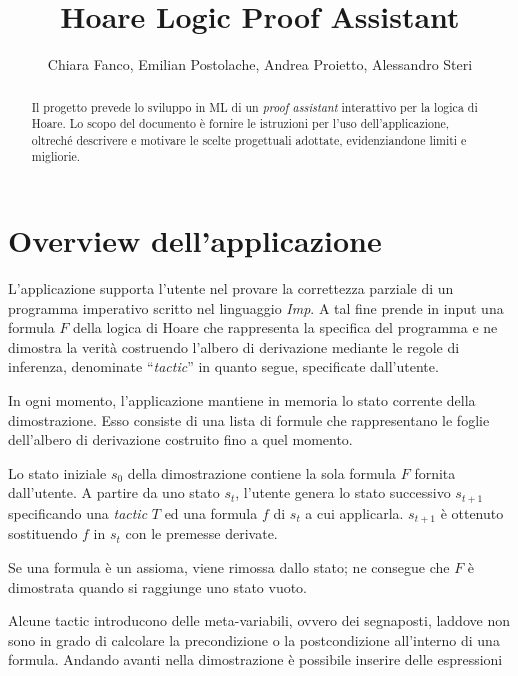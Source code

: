 \documentclass[]{article}
\title{Hoare Logic Proof Assistant}
\author{Chiara Fanco, Emilian Postolache, Andrea Proietto, Alessandro Steri}
\begin{document}
\maketitle

\begin{abstract}
Il progetto prevede lo sviluppo in ML di un \emph{proof assistant} interattivo per la logica di Hoare. Lo scopo del documento \`e fornire le istruzioni per l'uso dell'applicazione, oltrech\'e descrivere e motivare le scelte progettuali adottate, evidenziandone limiti e migliorie.
\end{abstract}

\section{Overview dell'applicazione}
L'applicazione supporta l'utente nel provare la correttezza parziale di un programma imperativo scritto nel linguaggio \emph{Imp}. %
 A tal fine prende in input una formula $F$ della logica di Hoare che rappresenta la specifica del programma e ne dimostra la verit\`a costruendo l'albero di derivazione mediante le regole di inferenza, denominate ``\emph{tactic}'' in quanto segue, specificate dall'utente.
\par
In ogni momento, l'applicazione mantiene in memoria lo stato corrente della dimostrazione. Esso consiste di una lista di formule che rappresentano le foglie dell'albero di derivazione costruito fino a quel momento.
\par
Lo stato iniziale $s_0$ della dimostrazione contiene la sola formula $F$ fornita dall'utente. A partire da uno stato $s_t$, l'utente genera lo stato successivo $s_{t+1}$ specificando una \emph{tactic} $T$ ed una formula $f$ di $s_t$ a cui applicarla. $s_{t+1}$ \`e ottenuto sostituendo $f$ in $s_t$ con le premesse derivate.
\par
Se una formula \`e un assioma, viene rimossa dallo stato; ne consegue che $F$ \`e dimostrata quando si raggiunge uno stato vuoto.

Alcune tactic introducono delle meta-variabili, ovvero dei segnaposti, laddove non sono in grado di calcolare la precondizione o la postcondizione all'interno di una formula.
Andando avanti nella dimostrazione \`e possibile inserire delle espressioni
\end{document}
